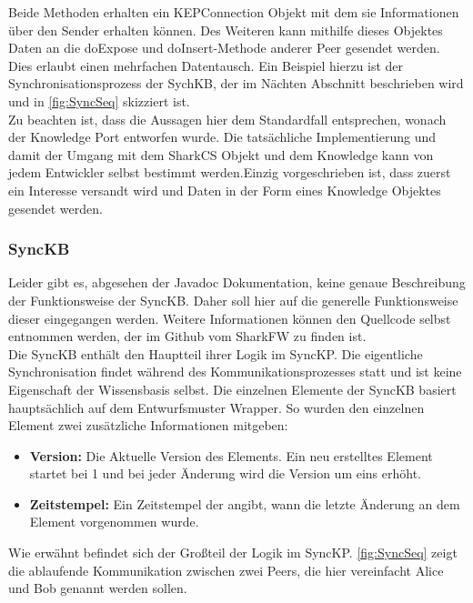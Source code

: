 \documentclass[a4paper]{article}
\begin{document}
	Beide Methoden erhalten ein KEPConnection Objekt mit dem sie Informationen 
	über den Sender erhalten können. Des Weiteren kann mithilfe dieses 
	Objektes Daten an die doExpose und doInsert-Methode anderer Peer gesendet
	werden. Dies erlaubt einen mehrfachen Datentausch. Ein Beispiel hierzu ist
	der Synchronisationsprozess der SychKB, der im Nächten Abschnitt beschrieben 
	wird und in \autoref{fig:SyncSeq} skizziert ist. \\
	
	Zu beachten ist, dass die Aussagen hier dem Standardfall entsprechen, wonach
	der Knowledge Port entworfen wurde. Die tatsächliche Implementierung und
	damit der Umgang mit dem SharkCS Objekt und dem Knowledge kann von jedem
	Entwickler selbst bestimmt werden.Einzig vorgeschrieben ist, dass zuerst
	ein Interesse versandt wird und Daten in der Form eines Knowledge Objektes
	gesendet werden.
	
	\subsubsection{SyncKB}
	\label{sec:SyncKB}
	
	Leider gibt es, abgesehen der Javadoc Dokumentation, keine genaue
	Beschreibung der Funktionsweise der SyncKB. Daher soll hier auf die
	generelle Funktionsweise dieser eingegangen werden. Weitere Informationen
	können den Quellcode selbst entnommen werden, der im Github vom SharkFW
	zu finden ist. \cite{SyncKB} \\
	
	Die SyncKB enthält den Hauptteil ihrer Logik im SyncKP. Die eigentliche
	Synchronisation findet während des Kommunikationsprozesses statt und ist
	keine Eigenschaft der Wissensbasis selbst. Die einzelnen Elemente der SyncKB
	basiert hauptsächlich auf dem Entwurfsmuster Wrapper. So wurden den einzelnen
	Element zwei zusätzliche Informationen mitgeben: 
	
	\begin{itemize}
		\item \textbf{Version:} Die Aktuelle Version des Elements. Ein neu 
		erstelltes Element startet bei 1 und bei jeder Änderung wird die
		Version um eins erhöht.
		\item \textbf{Zeitstempel:} Ein Zeitstempel der angibt, wann die letzte
		Änderung an dem Element vorgenommen wurde.
	\end{itemize} 
	
	Wie erwähnt befindet sich der Großteil der Logik im SyncKP.
	\autoref{fig:SyncSeq} zeigt die ablaufende Kommunikation zwischen zwei
	Peers, die hier vereinfacht Alice und Bob genannt werden sollen.	
	
\end{document}
